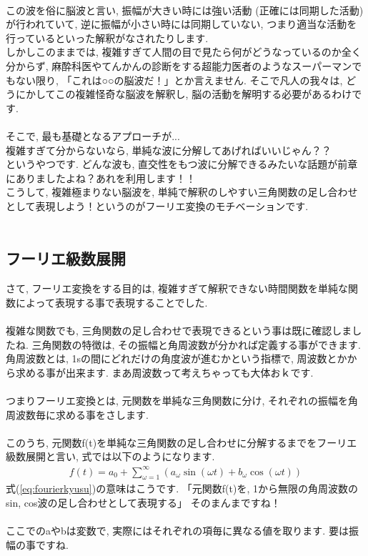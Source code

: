 \documentclass[11pt,a4paper]{jreport}
\begin{document}
\\
この波を俗に脳波と言い, 振幅が大きい時には強い活動 (正確には同期した活動) が行われていて, 逆に振幅が小さい時には同期していない, つまり適当な活動を行っているといった解釈がなされたりします. \\
しかしこのままでは, 複雑すぎて人間の目で見たら何がどうなっているのか全く分からず, 麻酔科医やてんかんの診断をする超能力医者のようなスーパーマンでもない限り, 「これは○○の脳波だ！」とか言えません. そこで凡人の我々は, どうにかしてこの複雑怪奇な脳波を解釈し, 脳の活動を解明する必要があるわけです.\\
\\
そこで, 最も基礎となるアプローチが...\\
複雑すぎて分からないなら, 単純な波に分解してあげればいいじゃん？？\\ 
というやつです. どんな波も, 直交性をもつ波に分解できるみたいな話題が前章にありましたよね？あれを利用します！！
\\
こうして, 複雑極まりない脳波を, 単純で解釈のしやすい三角関数の足し合わせとして表現しよう！というのがフーリエ変換のモチベーションです.\\
\\
\subsection{フーリエ級数展開}
さて, フーリエ変換をする目的は, 複雑すぎて解釈できない時間関数を単純な関数によって表現する事で表現することでした.\\
\\
複雑な関数でも, 三角関数の足し合わせで表現できるという事は既に確認しましたね. 三角関数の特徴は, その振幅と角周波数が分かれば定義する事ができます. \\
角周波数とは, 1sの間にどれだけの角度波が進むかという指標で, 周波数とかから求める事が出来ます. まあ周波数って考えちゃっても大体おｋです. \\
\\
つまりフーリエ変換とは, 元関数を単純な三角関数に分け, それぞれの振幅を角周波数毎に求める事をさします.\\
\\
このうち, 元関数f(t)を単純な三角関数の足し合わせに分解するまでをフーリエ級数展開と言い, 式では以下のようになります. 
\begin{eqnarray}
f(t) = a_0 + \sum_{\omega=1}^\infty {(a_\omega \sin(\omega t) + b_\omega \cos(\omega t))}
\label{eq:fourierkyusu}
\end{eqnarray}
式(\ref{eq:fourierkyusu})の意味はこうです. 「元関数f(t)を, 1から無限の角周波数のsin, cos波の足し合わせとして表現する」 そのまんまですね！\\
\\
ここでのaやbは変数で, 実際にはそれぞれの項毎に異なる値を取ります. 要は振幅の事ですね.\\
\end{document}
